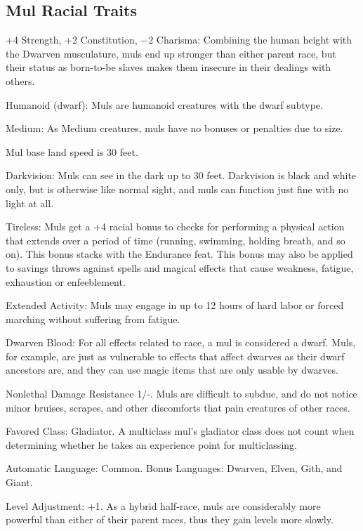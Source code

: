 \subsection{Mul Racial Traits}
\begin{itemize*}
    \item +4 Strength, +2 Constitution, $-2$ Charisma: Combining the human height with the Dwarven musculature, muls end up stronger than either parent race, but their status as born-to-be slaves makes them insecure in their dealings with others.
    \item Humanoid (dwarf): Muls are humanoid creatures with the dwarf subtype.
    \item Medium: As Medium creatures, muls have no bonuses or penalties due to size.
    \item Mul base land speed is 30 feet.
    \item Darkvision: Muls can see in the dark up to 30 feet. Darkvision is black and white only, but is otherwise like normal sight, and muls can function just fine with no light at all.
    \item Tireless: Muls get a +4 racial bonus to checks for performing a physical action that extends over a period of time (running, swimming, holding breath, and so on). This bonus stacks with the Endurance feat. This bonus may also be applied to savings throws against spells and magical effects that cause weakness, fatigue, exhaustion or enfeeblement.
    \item Extended Activity: Muls may engage in up to 12 hours of hard labor or forced marching without suffering from fatigue.
    \item Dwarven Blood: For all effects related to race, a mul is considered a dwarf. Muls, for example, are just as vulnerable to effects that affect dwarves as their dwarf ancestors are, and they can use magic items that are only usable by dwarves.
    \item Nonlethal Damage Resistance 1/-. Muls are difficult to subdue, and do not notice minor bruises, scrapes, and other discomforts that pain creatures of other races.
    \item Favored Class: Gladiator. A multiclass mul's gladiator class does not count when determining whether he takes an experience point for multiclassing.
    \item Automatic Language: Common. Bonus Languages: Dwarven, Elven, Gith, and Giant.
    \item Level Adjustment: +1. As a hybrid half‐race, muls are considerably more powerful than either of their parent races, thus they gain levels more slowly.
\end{itemize*}